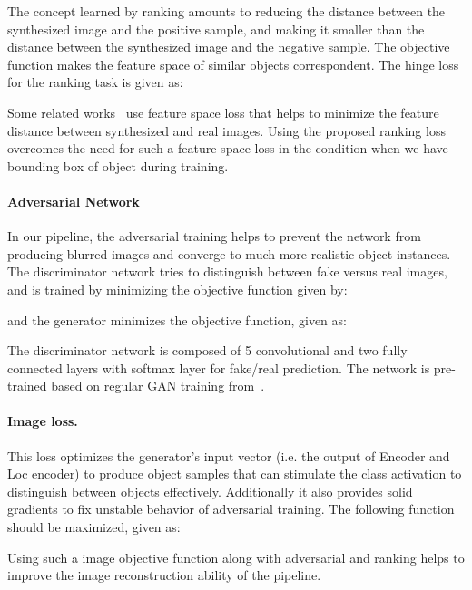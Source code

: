\documentclass[runningheads]{llncs}
\begin{document}
The concept learned by ranking amounts to reducing the distance between the synthesized image and the positive sample, and making it smaller than the distance between the synthesized image and the negative sample. The objective function makes the feature space of similar objects correspondent. The hinge loss for the ranking task is given as:

\noindent Some related works~\cite{dosovitskiy2,nguyen} use feature space loss that helps to minimize the feature distance between synthesized and real images. Using the proposed ranking loss overcomes the need for such a feature space loss in the condition when we have bounding box of object during training.

\iffalse
In our experiments, we observed that using a feature space loss in combination with our ranking loss did not improve the results, with the ranking loss in isolation being the clear winner. The feature loss is given as:

\fi

\paragraph{Adversarial Network}
In our pipeline, the adversarial training helps to prevent the network from producing blurred images and converge to much more realistic object instances. The discriminator network  tries to distinguish between fake versus real images, and is trained by minimizing the objective function given by:

and the generator minimizes the objective function, given as:

The discriminator network is composed of 5 convolutional and two fully connected layers with softmax layer for fake/real prediction. The network is pre-trained based on regular GAN training from~\cite{dosovitskiy2}.

\paragraph{Image loss.}
This loss optimizes the generator's input vector (i.e. the output of Encoder and Loc encoder) to produce object samples that can stimulate the class activation to distinguish between objects effectively. Additionally it also provides solid gradients to fix unstable behavior of adversarial training. The following function should be maximized, given as:


Using such a image objective function along with adversarial and ranking helps to improve the image reconstruction ability of the pipeline.
\end{document}
